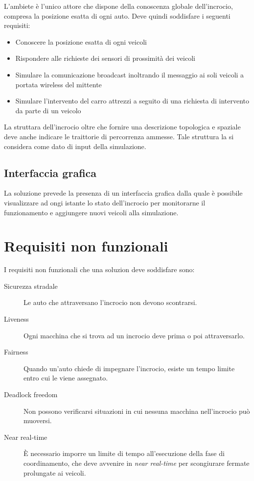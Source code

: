 \documentclass{memoir}
\begin{document}
L'ambiete è l'unico attore che dispone della conoscenza globale dell'incrocio,
compresa la posizione esatta di ogni auto. Deve quindi soddisfare i seguenti
requisiti:
\begin{itemize}
\item Conoscere la posizione esatta di ogni veicoli
\item Rispondere alle richieste dei sensori di prossimità dei veicoli
\item Simulare la comunicazione broadcast inoltrando il messaggio ai soli
  veicoli a portata wireless del mittente
\item Simulare l'intervento del carro attrezzi a seguito di una richiesta di
  intervento da parte di un veicolo
\end{itemize}

La struttara dell'incrocio oltre che fornire una descrizione topologica e
spaziale deve anche indicare le traittorie di percorrenza ammesse. Tale
struttura la si considera come dato di input della simulazione.

\subsection{Interfaccia grafica}

La soluzione prevede la presenza di un interfaccia grafica dalla quale è
possibile visualizzare ad ongi istante lo stato dell'incrocio per monitorarne il
funzionamento e aggiungere nuovi veicoli alla simulazione.


\section{Requisiti non funzionali}
I requisiti non funzionali che una soluzion deve soddisfare sono:
\begin{description}
\item[Sicurezza stradale] Le auto che attraversano l'incrocio non devono
  scontrarsi.
\item[Liveness] Ogni macchina che si trova ad un incrocio deve prima o poi
  attraversarlo.
\item[Fairness] Quando un'auto chiede di impegnare l'incrocio, esiste un tempo
  limite entro cui le viene assegnato.
\item[Deadlock freedom] Non possono verificarsi situazioni in cui nessuna
  macchina nell'incrocio può muoversi.
\item[Near real-time] È necessario imporre un limite di tempo all'esecuzione
  della fase di coordinamento, che deve avvenire in \emph{near real-time} per
  scongiurare fermate prolungate ai veicoli.
\end{description}
\end{document}
